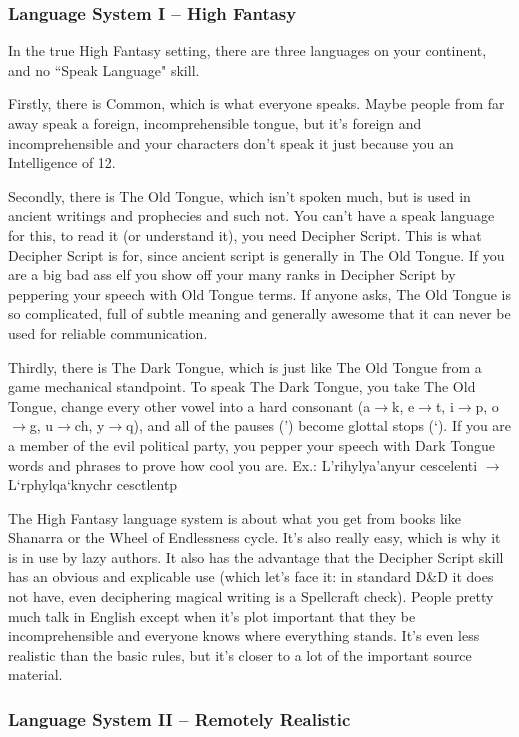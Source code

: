 \subsubsection{Language System I -- High Fantasy}

In the true High Fantasy setting, there are three languages on your continent, and no ``Speak Language" skill.

Firstly, there is Common, which is what everyone speaks. Maybe people from far away speak a foreign, incomprehensible tongue, but it's foreign and incomprehensible and your characters don't speak it just because you an Intelligence of 12.

Secondly, there is The Old Tongue, which isn't spoken much, but is used in ancient writings and prophecies and such not. You can't have a speak language for this, to read it (or understand it), you need Decipher Script. This is what Decipher Script is for, since ancient script is generally in The Old Tongue. If you are a big bad ass elf you show off your many ranks in Decipher Script by peppering your speech with Old Tongue terms. If anyone asks, The Old Tongue is so complicated, full of subtle meaning and generally awesome that it can never be used for reliable communication.

Thirdly, there is The Dark Tongue, which is just like The Old Tongue from a game mechanical standpoint. To speak The Dark Tongue, you take The Old Tongue, change every other vowel into a hard consonant (a$\rightarrow$k, e$\rightarrow$t, i$\rightarrow$p, o$\rightarrow$g, u$\rightarrow$ch, y$\rightarrow$q), and all of the pauses (') become glottal stops (`). If you are a member of the evil political party, you pepper your speech with Dark Tongue words and phrases to prove how cool you are.
Ex.: L'rihylya'anyur cescelenti $\rightarrow$ L`rphylqa`knychr cesctlentp

The High Fantasy language system is about what you get from books like Shanarra or the Wheel of Endlessness cycle. It's also really easy, which is why it is in use by lazy authors. It also has the advantage that the Decipher Script skill has an obvious and explicable use (which let's face it: in standard D\&D it does not have, even deciphering magical writing is a Spellcraft check). People pretty much talk in English except when it's plot important that they be incomprehensible and everyone knows where everything stands. It's even less realistic than the basic rules, but it's closer to a lot of the important source material.

\subsubsection{Language System II -- Remotely Realistic}

